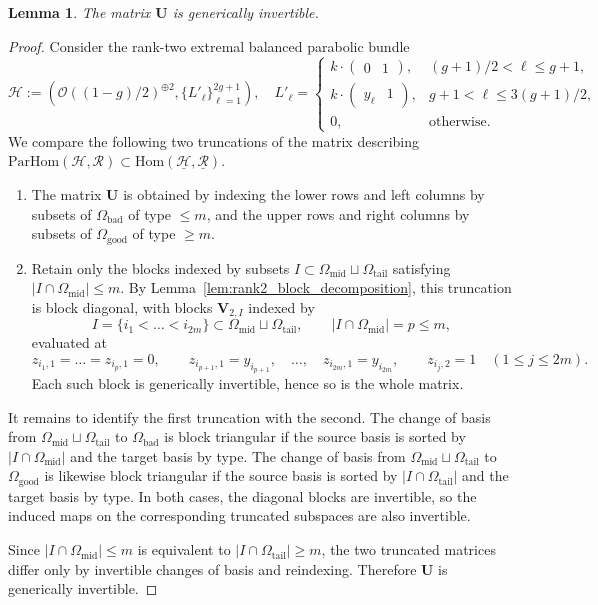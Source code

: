 \documentclass[12pt, letterpaper]{amsart}
\newtheorem{lemma}[theorem]{Lemma}
\theoremstyle{definition}
\newcommand{\cH}{\mathcal{H} }
\newcommand{\cO}{\mathcal{O} }
\newcommand{\cR}{\mathcal{R} }
\newcommand{\bU}{\mathbf{U} }
\newcommand{\bV}{\mathbf{V} }
\newcommand{\Om}{\Omega}
\newcommand{\pHom}{\mathrm{ParHom}}
\def\rHom{\mathrm{Hom} }
\begin{document}
\begin{lemma}\label{lem:big-invertible}
The matrix \(\bU\) is generically invertible.
\end{lemma}

\begin{proof}
Consider the rank-two extremal balanced parabolic bundle
\[
\cH:= \left(\cO\left((1-g)/2\right)^{\oplus 2},\{L'_\ell\}_{\ell=1}^{2g+1}\right),\quad L'_\ell= \begin{cases}
  k\cdot\begin{pmatrix} 0&1 \end{pmatrix}, & (g+1)/2 <\ell\le g+1,\\[6pt]
  k\cdot\begin{pmatrix} y_\ell&1 \end{pmatrix}, & g+1<\ell\le 3(g+1)/2,\\[6pt]
  0, & \text{otherwise}.
\end{cases}
\]
We compare the following two truncations of the matrix describing \(\pHom(\cH, \cR) \subset \rHom(\underline{\cH}, \underline{\cR})\).
\begin{enumerate}
  \item The matrix \(\bU\) is obtained by indexing the lower rows and left columns by subsets of \(\Om_{\mathrm{bad}}\) of type \(\le m\), and the upper rows and right columns by subsets of \(\Om_{\mathrm{good}}\) of type \(\ge m\).
  \item Retain only the blocks indexed by subsets \(I\subset\Om_{\mathrm{mid}}\sqcup\Om_{\mathrm{tail}}\) satisfying \(|I\cap\Om_{\mathrm{mid}}|\le m\). By Lemma~\ref{lem:rank2_block_decomposition}, this truncation is block diagonal, with blocks \(\bV_{2,I}\) indexed by
  \[I=\{i_1<\ldots<i_{2m}\}\subset\Om_{\mathrm{mid}}\sqcup\Om_{\mathrm{tail}},\qquad|I\cap\Om_{\mathrm{mid}}|=p\le m,\]
  evaluated at
  \[z_{i_1,1}=\dots=z_{i_p,1}=0,\qquad z_{i_{p+1},1}=y_{i_{p+1}},\quad\dots,\quad z_{i_{2m},1}=y_{i_{2m}},\qquad z_{i_j,2}=1\quad(1\le j\le2m).\]
  Each such block is generically invertible, hence so is the whole matrix.
\end{enumerate}

It remains to identify the first truncation with the second. The change of basis from \(\Om_{\mathrm{mid}}\sqcup\Om_{\mathrm{tail}}\) to \(\Om_{\mathrm{bad}}\) is block triangular if the source basis is sorted by \(|I\cap\Om_{\mathrm{mid}}|\) and the target basis by type. The change of basis from \(\Om_{\mathrm{mid}} \sqcup \Om_{\mathrm{tail}}\) to \(\Om_{\mathrm{good}}\) is likewise block triangular if the source basis is sorted by \(|I\cap\Om_{\mathrm{tail}}|\) and the target basis by type. In both cases, the diagonal blocks are invertible, so the induced maps on the corresponding truncated subspaces are also invertible.

Since \(|I\cap\Om_{\mathrm{mid}}|\le m\) is equivalent to \(|I\cap\Om_{\mathrm{tail}}|\ge m\), the two truncated matrices differ only by invertible changes of basis and reindexing. Therefore \(\bU\) is generically invertible.
\end{proof}

\footnotesize \printbibliography
\end{document}
